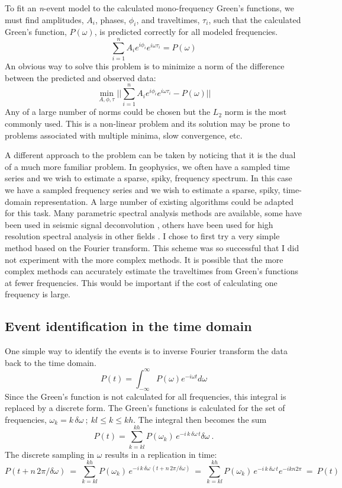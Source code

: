 To fit an {\it n}-event model to the calculated mono-frequency Green's functions, we
must find amplitudes, $A_i$, phases, $\phi_i$, and traveltimes, $\tau_i$,
such that the calculated Green's function, $P(\omega)$, is predicted correctly
for all modeled frequencies.
$$
 \sum_{i=1}^n A_i e^{i\phi_i}e^{ i \omega \tau_i } = P( \omega )
$$
An obvious way to solve this problem is to minimize a norm of the difference
between the predicted and observed data:
$$
\min_{A,\phi,\tau} ||  \sum_{i=1}^n A_i e^{i\phi_i}e^{ i \omega \tau_i } - P( \omega ) ||
$$ 
Any of a large number of norms could be chosen but the $L_2$ norm
is the most commonly used.  This is a non-linear problem and its
solution may be prone to problems associated with multiple minima, slow
convergence, etc.

A different approach to the problem can be taken by noticing that it
is the dual of a much more familiar problem. In geophysics, we often
have a sampled time series and we wish to estimate a sparse, spiky,
frequency spectrum.  In this case we have a sampled frequency series
and we wish to estimate a sparse, spiky, time-domain representation.
A large number of existing algorithms could be adapted for this task.
Many parametric spectral analysis methods are available, some have
been used in seismic signal deconvolution
\cite{Burg.sepphd.6,DEC00.00.00000482}, others have been used for high
resolution spectral analysis in other fields
\cite{orthog,MUSIC,pisarenk}. I chose to first try a very simple
method based on the Fourier transform. This scheme was so successful
that I did not experiment with the more complex methods. It is
possible that the more complex methods can accurately estimate the
traveltimes from Green's functions at fewer frequencies. This would be
important if the cost of calculating one frequency is large. 

\subsection{Event identification in the time domain }

One simple way to identify the events is to
inverse Fourier transform the data back to the time domain.
$$
P(t) = \int_{-\infty}^{\infty} P(\omega) e^{- i \omega t} d\omega
$$
Since the Green's function is not calculated for all frequencies,
this integral is replaced by a discrete form.
The Green's functions is calculated for the set of
frequencies, $\omega_k = k\, \delta\omega\ ;\ kl \leq k \leq kh $. The
integral then becomes the sum
$$
P(t) = \sum_{k=kl}^{kh} P(\omega_k)\, e^{ - i\, k\,\delta\omega\, t } \delta \omega \ .
$$
The discrete sampling in $\omega$ results in a replication in time:
$$
P(t + n\,2\pi/\delta\omega)\ =\ \sum_{k=kl}^{kh} P(\omega_k)\, e^{ - i\, k\,\delta\omega\, ( t + n\,2\pi/\delta\omega )}\ =\  \sum_{k=kl}^{kh} P(\omega_k)\, e^{ - i\, k\,\delta\omega\, t}e^{ -i kn 2\pi } \ =\ P(t) 
$$

